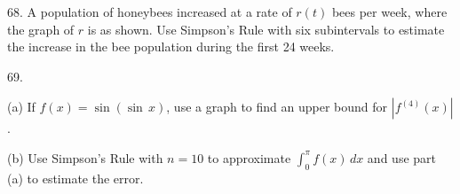 \documentclass{sebase}
\begin{document}
\begin{multicols}{2}
\begin{ExerciseList}
%

%

\item[\hfill 68.] A population of honeybees increased at a rate of $r\left(
t\right) $ bees per week, where the graph of $r$ is as shown. Use Simpson's
Rule with six subintervals to estimate the increase in the bee population
during the first 24 weeks.\\[4pt]
\hspace*{\fill}\hspace*{\fill}\vspace*{%
-6pt}

%

\item[\hfill 69.] 

\begin{ExerciseList}
\item[(a)] 
\CASXT%
If $f(x)=\sin (\sin \,x)$, use a graph to find an upper bound for $%
\left\vert f^{(4)}(x)\right\vert $.

%

%

\item[(b)] Use Simpson's Rule with $n=10$ to approximate \newline
$\int_{0}^{\pi }f(x)\,dx$ and use part (a) to estimate the error.


\end{ExerciseList}
\end{ExerciseList}
\end{multicols}
\end{document}
